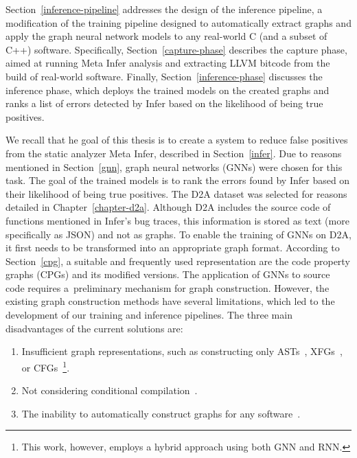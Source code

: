 Section~\ref{inference-pipeline} addresses the design of the inference pipeline, a modification of the training pipeline designed to automatically extract graphs and apply the graph neural network models to any real-world C (and a subset of C++) software. Specifically, Section~\ref{capture-phase} describes the capture phase, aimed at running Meta Infer analysis and extracting LLVM bitcode from the build of real-world software. Finally, Section~\ref{inference-phase} discusses the inference phase, which deploys the trained models on the created graphs and ranks a list of errors detected by Infer based on the likelihood of being true positives.

We recall that he goal of this thesis is to create a system to reduce false positives from the static analyzer Meta Infer, described in Section~\ref{infer}. Due to reasons mentioned in Section~\ref{gnn}, graph neural networks (GNNs) were chosen for this task. The goal of the trained models is to rank the errors found by Infer based on their likelihood of being true positives. The D2A dataset was selected for reasons detailed in Chapter~\ref{chapter-d2a}. Although D2A includes the source code of functions mentioned in Infer's bug traces, this information is stored as text (more specifically as JSON) and not as graphs. To enable the training of GNNs on D2A, it first needs to be transformed into an appropriate graph format. According to Section~\ref{cpg}, a suitable and frequently used representation are the code property graphs (CPGs) and its modified versions. The application of GNNs to source code requires a~preliminary mechanism for graph construction. However, the existing graph construction methods have several limitations, which led to the development of our training and inference pipelines. The three main disadvantages of the current solutions are:

\begin{enumerate}
    \item Insufficient graph representations, such as constructing only ASTs~\cite{GNN5-vsikic2022graph}, XFGs~\cite{GNN3-cheng2021deepwukong}, or CFGs~\cite{GNN7-RNN-rabheru2020hybrid}\footnote{This work, however, employs a hybrid approach using both GNN and RNN.}.
    \item Not considering conditional compilation~\cite{GNN1-cao2021bgnn4vd, JOERN-CPG-guan2020code, GNN4-IBM-suneja2020learning, JOERN-CPG-xiaomeng2018cpgva, GNN2-zhou2019devign}.
    \item The inability to automatically construct graphs for any software~\cite{GNN1-cao2021bgnn4vd, JOERN-CPG-guan2020code, GNN4-IBM-suneja2020learning, JOERN-CPG-xiaomeng2018cpgva, GNN2-zhou2019devign}.
\end{enumerate}

